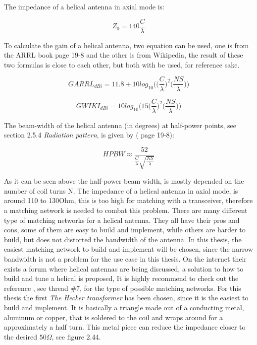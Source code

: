 The impedance of a helical antenna in axial mode is: 

\begin{equation}
   Z_0 = 140\frac{C}{\lambda}
\end{equation}

To calculate the gain of a helical antenna, two equation can be used, one is from the ARRL book\cite{ARRL} page 19-8 and the other is from Wikipedia\cite{HelicalAntennaWiki}, the result of these two formulas is close to each other, but both with be used, for reference sake.  

\begin{equation}
   GARRL_{dBi} = 11.8+10log_{10}\Big(\Big(\frac{C}{\lambda}\Big)^2\Big(\frac{NS}{\lambda}\Big)\Big)
\end{equation}

\begin{equation}
   GWIKI_{dBi} = 10log_{10}\Big(15\Big(\frac{C}{\lambda}\Big)^2\Big(\frac{NS}{\lambda}\Big)\Big)
\end{equation}

The beam-width of the helical antenna (in degrees) at half-power points, see section 2.5.4 \textit{Radiation pattern}, is given by (\cite{ARRL} page 19-8):

\begin{equation}
   HPBW \approx \frac{52}{\frac{C}{\lambda}\sqrt{\frac{NS}{\lambda}}}
\end{equation}

As it can be seen above the half-power beam width, is mostly depended on the number of coil turns N. The impedance of a helical antenna in axial mode, is around 110 to 130Ohm, this is too high for matching with a transceiver, therefore a matching network is needed to combat this problem. There are many different type of matching networks for a helical antenna. They all have their pros and cons, some of them are easy to build and implement, while others are harder to build, but does not distorted the bandwidth of the antenna. In this thesis, the easiest matching network to build and implement will be chosen, since the narrow bandwidth is not a problem for the use case in this thesis. On the internet their exists a forum where helical antennas are being discussed, a solution to how to build and tune a helical is proposed, It is highly recommend to check out the reference \cite{RCGroups}, see thread \#7, for the type of possible matching networks. For this thesis the first \textit{The Hecker transformer} has been chosen, since it is the easiest to build and implement. It is basically a triangle made out of a conducting metal, aluminum or copper, that is soldered to the coil and wraps around for a approximately a half turn. This metal piece can reduce the impedance closer to the desired $50\Omega$, see figure 2.44.  

